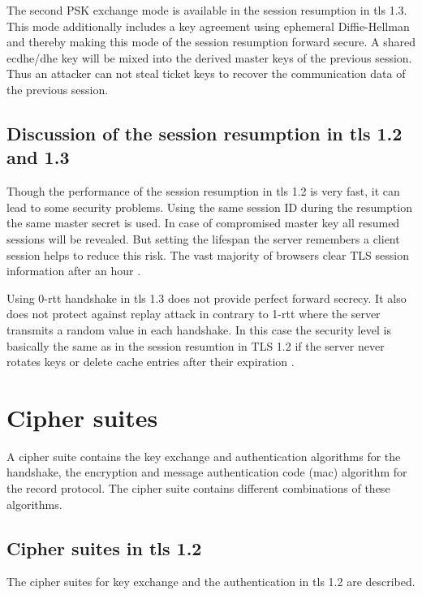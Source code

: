 The second PSK exchange mode is available in the session resumption in \gls{tls} 1.3. This mode additionally includes a key agreement using ephemeral Diffie-Hellman and thereby making this mode of the session resumption forward secure. A shared \gls{ecdhe}/\gls{dhe} key will be mixed into the derived master keys of the previous session. Thus an attacker can not steal ticket keys to recover the communication data of the previous session. \cite{taubert} 

\subsection{Discussion of the session resumption in \gls{tls} 1.2 and 1.3}
\label{subsec:discussion_resumption}
Though the performance of the session resumption in \gls{tls} 1.2 is very fast, it can lead to some security problems. Using the same session ID during the resumption the same master secret is used. In case of compromised master key all resumed sessions will be revealed.
But setting the lifespan the server remembers a client session helps to reduce this risk. The vast majority of browsers clear TLS session information after an hour \cite{zdnet}.

Using 0-\gls{rtt} handshake in \gls{tls} 1.3 does not provide perfect forward secrecy. It also does not protect against replay attack in contrary to 1-\gls{rtt} where the server transmits a random value in each handshake.
\cite{recorla}
In this case the security level is basically the same as in the session resumtion in TLS 1.2 if the server never rotates keys or delete cache entries after their expiration \cite{taubert}.

\section{Cipher suites}
\label{sec:comparison_ciphersuits}

A cipher suite contains the key exchange and authentication algorithms for the handshake, the encryption and message authentication code (\gls{mac}) algorithm for the record protocol. The cipher suite contains different combinations of these algorithms.

\subsection{Cipher suites in \gls{tls} 1.2}
\label{subsec:ciphersuits1_2}

The cipher suites for key exchange and the authentication in \gls{tls} 1.2 are described.

